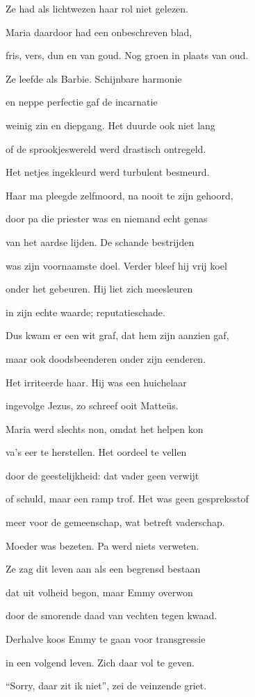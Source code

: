 Ze had als lichtwezen
haar rol niet gelezen.

Maria daardoor had
een onbeschreven blad,

fris, vers, dun en van goud.
Nog groen in plaats van oud.

Ze leefde als Barbie.
Schijnbare harmonie

en neppe perfectie
gaf de incarnatie

weinig zin en diepgang.
Het duurde ook niet lang

of de sprookjeswereld
werd drastisch ontregeld.

Het netjes ingekleurd
werd turbulent besmeurd.

Haar ma pleegde zelfmoord,
na nooit te zijn gehoord,

door pa die priester was
en niemand echt genas

van het aardse lijden.
De schande bestrijden

was zijn voornaamste doel.
Verder bleef hij vrij koel

onder het gebeuren.
Hij liet zich meesleuren

in zijn echte waarde;
reputatieschade.

Dus kwam er een wit graf,
dat hem zijn aanzien gaf,

maar ook doodsbeenderen
onder zijn eenderen.

Het irriteerde haar.
Hij was een huichelaar

ingevolge Jezus,
zo schreef ooit Matteüs.

Maria werd slechts non,
omdat het helpen kon

va’s eer te herstellen.
Het oordeel te vellen

door de geestelijkheid:
dat vader geen verwijt

of schuld, maar een ramp trof.
Het was geen gespreksstof

meer voor de gemeenschap,
wat betreft vaderschap.

Moeder was bezeten.
Pa werd niets verweten.

Ze zag dit leven aan
als een begrensd bestaan

dat uit volheid begon,
maar Emmy overwon

door de smorende daad
van vechten tegen kwaad.

Derhalve koos Emmy
te gaan voor transgressie

in een volgend leven.
Zich daar vol te geven.

“Sorry, daar zit ik niet”,
zei de veinzende griet.

